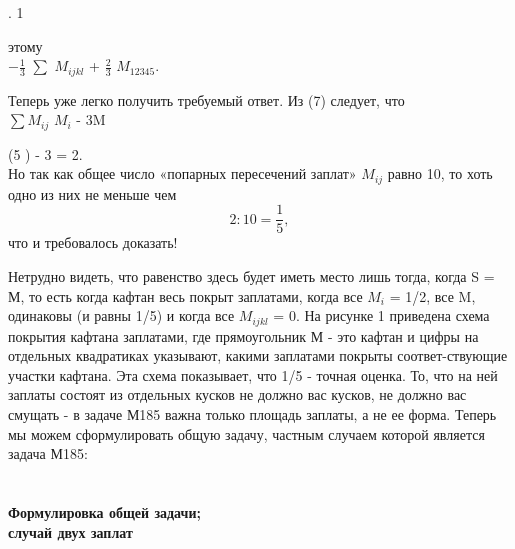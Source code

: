 \newpage
\begin{multicols}{2}
\begin{table}

. 1

\end{table}

\quad 

этому\\

$-\frac{1}{3}$ $\sum$ $M_{ijkl}$ + $\frac{2}{3}$ $M_{12345}$.

Теперь уже легко получить требуемый ответ. Из (7) следует, что\\

$\sum$$M_{ij}$ \sum $M_{i}$ - 3M \geq

           \qquad    \qquad     \qquad           {} (5 \cdot {}) - 3 = 2.\\

\noindent Но так как общее число «попарных пересечений заплат» $M_{ij}$ равно 10, то хоть одно из них не меньше чем   
$$2:10=\frac{1}{5},$$
что и требовалось доказать! 

Нетрудно видеть, что равенство здесь будет иметь место лишь тогда,
когда S = М, то есть когда кафтан весь покрыт заплатами, когда все
$M_{i}$ = 1/2, все M, одинаковы (и равны 1/5) и когда все $M_{ijkl}$ = 0. На рисунке 1 приведена схема покрытия кафтана заплатами, где прямоугольник М - это кафтан и цифры на отдельных квадратиках указывают, какими заплатами покрыты соответ-ствующие участки кафтана. Эта схема показывает, что 1/5 - точная оценка. То, что на ней заплаты состоят из отдельных кусков не должно вас кусков, не должно вас смущать - в задаче М185 важна только площадь заплаты, а не ее форма.
Теперь мы можем сформулировать общую задачу, частным случаем которой является задача М185:
\\
\\
\\
\textbf{Формулировка общей задачи;\\случай двух заплат}


\end{multicols}
